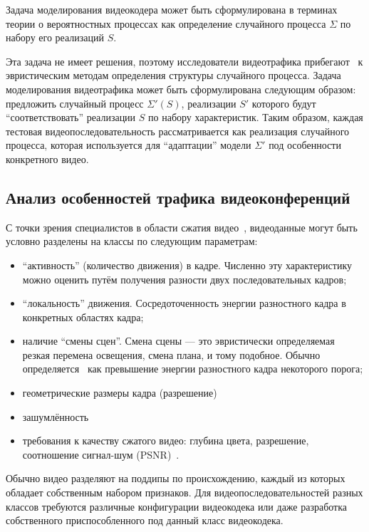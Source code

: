 Задача моделирования видеокодера может быть сформулирована в терминах
теории о вероятностных процессах как определение случайного
процесса $\Sigma$ по набору его реализаций $S$.

Эта задача не имеет решения, поэтому исследователи видеотрафика
прибегают~\cite{characteristics2013} к эвристическим методам определения структуры
случайного процесса. Задача моделирования видеотрафика может быть
сформулирована следующим образом: предложить случайный процесс
$\Sigma'(S)$, реализации $S'$ которого будут ``соответствовать''
реализации $S$ по набору характеристик. Таким образом,
каждая тестовая видеопоследовательность рассматривается
как реализация случайного процесса, которая используется
для ``адаптации'' модели $\Sigma'$ под особенности
конкретного видео.

\subsection{Анализ особенностей трафика видеоконференций}

С точки зрения специалистов в области сжатия видео~\cite{survey2013},
видеоданные могут быть условно разделены на классы по
следующим параметрам:

\begin{itemize}
    \item ``активность'' (количество движения) в кадре. Численно 
        эту характеристику можно оценить путём получения разности
        двух последовательных кадров;
    \item ``локальность'' движения. Сосредоточенность энергии
        разностного кадра в конкретных областях кадра;
    \item наличие ``смены сцен''. Смена сцены --- это эвристически
        определяемая резкая перемена освещения, смена плана,
        и тому подобное. Обычно определяется~\cite{scenedetection} как превышение
        энергии разностного кадра некоторого порога;
    \item геометрические размеры кадра (разрешение)
    \item зашумлённость
    \item требования к качеству сжатого видео: глубина цвета,
        разрешение, соотношение сигнал-шум (PSNR)~\cite{salomoncomp}.
\end{itemize}

Обычно видео разделяют на поддипы по происхождению,
каждый из которых обладает собственным набором признаков.
Для видеопоследовательностей разных классов требуются
различные конфигурации видеокодека или даже разработка
собственного приспособленного под данный класс видеокодека.

